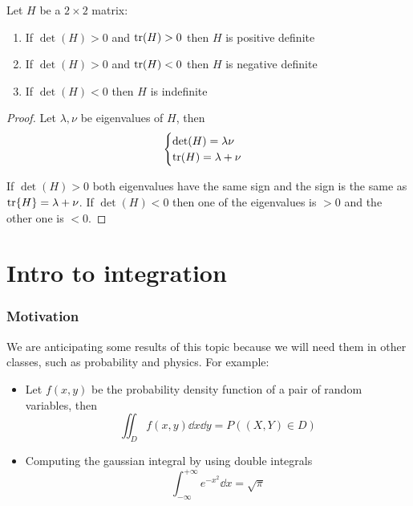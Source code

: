 \documentclass[12pt]{extarticle}
\begin{document}
\begin{lemma}[$d = 2$]
    Let $H$ be a $2 \times 2$ matrix:
    \begin{enumerate}[label=\roman*.]
        \item If $\det(H) > 0$ and $\tr(H) > 0$ then $H$ is positive definite
        \item If $\det(H) > 0$ and $\tr(H) < 0$ then $H$ is negative definite
        \item If $\det(H) < 0$ then $H$ is indefinite
    \end{enumerate}
\end{lemma}

\begin{proof}
    Let $\lambda, \nu$ be eigenvalues of $H$, then
    \begin{equation}
        \begin{cases}
            \det(H) = \lambda \nu \\
            \tr(H) = \lambda + \nu
        \end{cases}
    \end{equation}

    If $\det(H) > 0$ both eigenvalues have the same sign and the sign is the same as $\tr{H} = \lambda + \nu$.
    If $\det(H) < 0$ then one of the eigenvalues is $> 0$ and the other one is $< 0$.
\end{proof}

\section{Intro to integration}

\subsubsection{Motivation}

We are anticipating some results of this topic because we will need them in other classes, such as probability and physics.
For example:
\begin{itemize}
    \item Let $f(x, y)$ be the probability density function of a pair of random variables, then
          \begin{equation}
              \iint_D f(x, y) \dd{x} \dd{y} = P((X, Y) \in D)
          \end{equation}
    \item Computing the gaussian integral by using double integrals
          \begin{equation}
              \int_{-\infty}^{+\infty} e^{-x^2} \dd{x} = \sqrt{\pi}
          \end{equation}
\end{itemize}
\end{document}
